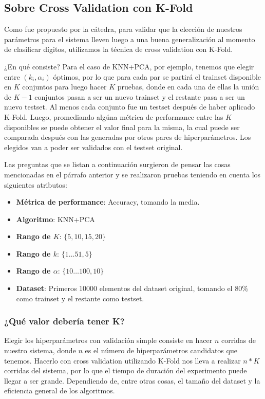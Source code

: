 \subsection{Sobre Cross Validation con K-Fold}

Como fue propuesto por la cátedra, para validar que la elección de nuestros parámetros para el sistema lleven luego a una buena generalización al momento de clasificar dígitos, utilizamos la técnica de cross validation con K-Fold.

¿En qué consiste? Para el caso de KNN+PCA, por ejemplo, tenemos que elegir entre $(k_i, \alpha_i)$ óptimos, por lo que para cada par se partirá el trainset disponible en $K$ conjuntos para luego hacer $K$ pruebas, donde en cada una de ellas la unión de $K-1$ conjuntos pasan a ser un nuevo trainset y el restante pasa a ser un nuevo testset. Al menos cada conjunto fue un testset después de haber aplicado K-Fold. Luego, promediando algúna métrica de performance entre las $K$ disponibles se puede obtener el valor final para la misma, la cual puede ser comparada después con las generadas por otros pares de hiperparámetros. Los elegidos van a poder ser validados con el testset original.

Las preguntas que se listan a continuación surgieron de pensar las cosas mencionadas en el párrafo anterior y se realizaron pruebas teniendo en cuenta los siguientes atributos:

\begin{itemize}
    \item \textbf{Métrica de performance}: Accuracy, tomando la media.
    \item \textbf{Algoritmo}: KNN+PCA
    \item \textbf{Rango de $K$}: $\{5, 10, 15, 20\}$
    \item \textbf{Rango de $k$}: $\{1\dots51, 5\}$
    \item \textbf{Rango de $\alpha$}: $\{10\dots100, 10\}$
    \item \textbf{Dataset}: Primeros 10000 elementos del dataset original, tomando el $80\%$ como trainset y el restante como testset.
\end{itemize}

\subsubsection{¿Qué valor debería tener K?}\label{KFoldValueK}

Elegir los hiperparámetros con validación simple consiste en hacer $n$ corridas de nuestro sistema, donde $n$ es el número de hiperparámetros candidatos que tenemos. Hacerlo con cross validation utilizando K-Fold nos lleva a realizar $n * K$ corridas del sistema, por lo que el tiempo de duración del experimento puede llegar a ser grande. Dependiendo de, entre otras cosas, el tamaño del dataset y la eficiencia general de los algoritmos.

